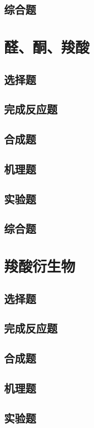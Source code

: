 \documentclass[
  10pt,
  twoside,
  openany,
  b5paper, %
  colorscheme = basic, %
]{qyxf-book}
\begin{document}
\section{综合题}

\chapter{醛、酮、羧酸}

\section{选择题}
\section{完成反应题}
\section{合成题}
\section{机理题}
\section{实验题}
\section{综合题}

\chapter{羧酸衍生物}

\section{选择题}
\section{完成反应题}
\section{合成题}
\section{机理题}
\section{实验题}
\end{document}
